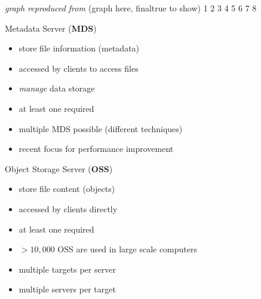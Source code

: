 \begin{frame}
{
    }

    \hfill{\scriptsize\emph{graph reproduced from \cite{whitepaper}}}
\else
    (graph here, finaltrue to show)
     {1}
     {2}
     {3}
     {4}
     {5}
     {6}
     {7}
     {8}
\fi
\end{frame}

\begin{frame}{Metadata Server (\textbf{MDS})}
    \begin{itemize}
        \item store file information (metadata)
        \item accessed by clients to access files
        \item \emph{manage} data storage
        \item at least one required
        \item multiple MDS possible (different techniques)
        \item recent focus for performance improvement
    \end{itemize}
\end{frame}


\begin{frame}{Object Storage Server (\textbf{OSS})}
    \begin{itemize}
        \item store file content (objects)
        \item accessed by clients directly
        \item at least one required
        \item $>10,000$ OSS are used in large scale computers
        \item multiple targets per server
        \item multiple servers per target
    \end{itemize}
\end{frame}


